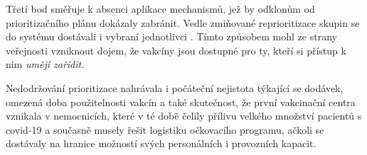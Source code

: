 Třetí bod směřuje k absenci aplikace mechanismů, jež by odklonům od prioritizačního plánu dokázaly zabránit.
Vedle zmiňované reprioritizace skupin se do systému dostávali i vybraní jednotlivci \cite{logoc_namestkyne, logoc_kabatek, CTK2021JsemDenik, logo_hejtman, logo_predbihani}.
Tímto způsobem mohl ze strany veřejnosti vzniknout dojem, že vakcíny jsou dostupné pro ty, kteří si přístup k nim \emph{umějí zařídit}. 

Nedodržování prioritizace nahrávala i počáteční nejistota týkající se dodávek, omezená doba použitelnosti vakcín a také skutečnost, že první vakcinační centra vznikala v nemocnicích, které v té době čelily přílivu velkého množství pacientů s covid-19 a současně musely řešit logistiku očkovacího programu, ačkoli se dostávaly na hranice možností svých personálních i provozních kapacit. 


 
